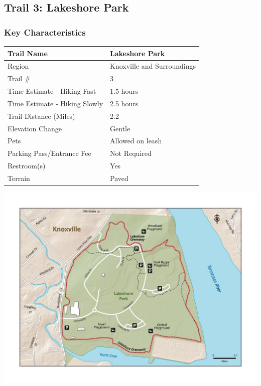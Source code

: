 \documentclass[
  letterpaper,
  DIV=11,
  numbers=noendperiod]{scrartcl}
\begin{document}
\hypertarget{trail-3-lakeshore-park}{%
\subsection{Trail 3: Lakeshore Park}\label{trail-3-lakeshore-park}}

\hypertarget{key-characteristics-2}{%
\subsubsection{Key Characteristics}\label{key-characteristics-2}}

\begin{longtable}[]{@{}ll@{}}
\toprule\noalign{}
Trail Name & Lakeshore Park \\
\midrule\noalign{}
\endhead
\bottomrule\noalign{}
\endlastfoot
Region & Knoxville and Surroundings \\
Trail \# & 3 \\
Time Estimate - Hiking Fast & 1.5 hours \\
Time Estimate - Hiking Slowly & 2.5 hours \\
Trail Distance (Miles) & 2.2 \\
Elevation Change & Gentle \\
Pets & Allowed on leash \\
Parking Pass/Entrance Fee & Not Required \\
Restroom(s) & Yes \\
Terrain & Paved \\
\end{longtable}

\includegraphics{maps/trail-03-map.jpeg}
\end{document}
